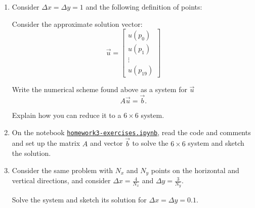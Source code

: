 \documentclass[letter]{article}
\newcommand{\mat}[1]{\begin{bmatrix}#1\end{bmatrix}}
\begin{document}
\begin{enumerate}[resume, label=\textbf{\arabic*.}]
	\item Consider $\Delta x = \Delta y = 1$ and the following definition of points:
		\begin{center}
	\end{center}

	Consider the approximate solution vector:
	\[ \vec{u} = 
		\mat{u(p_0) \\ u(p_1) \\ \vdots \\ u(p_{19}) }
	\]

	Write the numerical scheme found above as a system for $\vec{u}$
	\[
	A \vec{u} = \vec{b}.
	\]
	
	Explain how you can reduce it to a $6 \times 6$ system.
	
	\item On the notebook \href{https://utoronto.syzygy.ca/jupyter/user-redirect/git-pull?repo=https://github.com/bigfatbernie/IBLMathModeling&subPath=homeworks/homework3/homework3-exercises.ipynb}{\tt homework3-exercises.ipynb}, 
	read the code and comments and set up the matrix $A$ and vector $\vec{b}$ to solve the $6\times 6$ system and sketch the solution.
	
	\item Consider the same problem with $N_x$ and $N_y$ points on the horizontal and vertical directions, and consider $\Delta x = \frac{4}{N_x}$ and $\Delta y = \frac{3}{N_y}$.
	
		Solve the system and sketch its solution for $\Delta x = \Delta y = 0.1$.
		

\end{enumerate}
\end{document}
